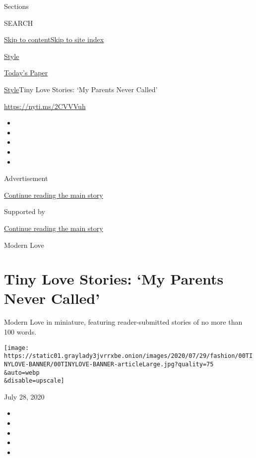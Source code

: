 Sections

SEARCH

\protect\hyperlink{site-content}{Skip to
content}\protect\hyperlink{site-index}{Skip to site index}

\href{https://www.nytimes3xbfgragh.onion/section/style}{Style}

\href{https://myaccount.nytimes3xbfgragh.onion/auth/login?response_type=cookie\&client_id=vi}{}

\href{https://www.nytimes3xbfgragh.onion/section/todayspaper}{Today's
Paper}

\href{/section/style}{Style}\textbar{}Tiny Love Stories: `My Parents
Never Called'

\href{https://nyti.ms/2CVVVuh}{https://nyti.ms/2CVVVuh}

\begin{itemize}
\item
\item
\item
\item
\item
\end{itemize}

Advertisement

\protect\hyperlink{after-top}{Continue reading the main story}

Supported by

\protect\hyperlink{after-sponsor}{Continue reading the main story}

Modern Love

\hypertarget{tiny-love-stories-my-parents-never-called}{%
\section{Tiny Love Stories: `My Parents Never
Called'}\label{tiny-love-stories-my-parents-never-called}}

Modern Love in miniature, featuring reader-submitted stories of no more
than 100 words.

\texttt{[image: https://static01.graylady3jvrrxbe.onion/images/2020/07/29/fashion/00TINYLOVE-BANNER/00TINYLOVE-BANNER-articleLarge.jpg?quality=75\\\&auto=webp\\\&disable=upscale]}

July 28, 2020

\begin{itemize}
\item
\item
\item
\item
\item
\end{itemize}

